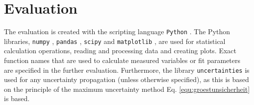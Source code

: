 \section{Evaluation}
\label{sec:evaluation}
The evaluation is created with the scripting language \verb|Python| \cite{PYTHON}.
The Python libraries, \verb|numpy| \cite{harris2020array}, \verb|pandas| \cite{reback2020pandas}, \verb|scipy| \cite{2020SciPy-NMeth} and \verb|matplotlib| \cite{Hunter:2007}, are used for statistical calculation operations, reading and processing data and creating plots.
Exact function names that are used to calculate measured variables or fit parameters are specified in the further evaluation.
Furthermore, the library \verb|uncertainties| \cite{UN} is used for any uncertainty propagation (unless otherwise specified), as this is based on the principle of the maximum uncertainty method Eq. \ref{equ:groestunsicherheit} is based.
